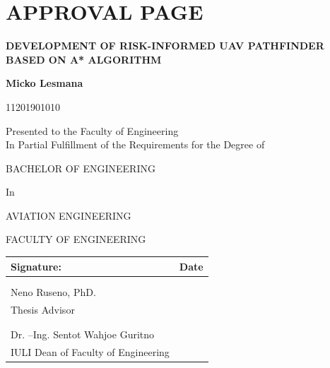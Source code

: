 \documentclass[12pt]{report}
\begin{document}
    \chapter*{APPROVAL PAGE}
        \begin{center}
        {\textbf{DEVELOPMENT OF RISK-INFORMED UAV PATHFINDER BASED ON A* ALGORITHM}}\par\vspace{0.1cm}
        \textbf{Micko Lesmana}\par
        {11201901010}\par
        Presented to the Faculty of Engineering\\
        In Partial Fulfillment of the Requirements for the Degree of\par\vspace{0.5cm}
        
        {BACHELOR OF ENGINEERING}\par
        {In}\par
        {AVIATION ENGINEERING}\par
        
        {FACULTY OF ENGINEERING}\par\vspace{1cm}

            \begin{tabular}{@{}p{4in}@{}|@{}p{1in}@{}}
            Signature:                          & Date\\
            \hline
                                                & \\
                                                & \\
            Neno Ruseno, PhD.                   & \\
            Thesis Advisor                      & \\
            \hline
                                                & \\
                                                & \\
            Dr. –Ing. Sentot Wahjoe Guritno     & \\
            IULI Dean of Faculty of Engineering & \\
            \hline
            \end{tabular}
        \end{center}
\end{document}
